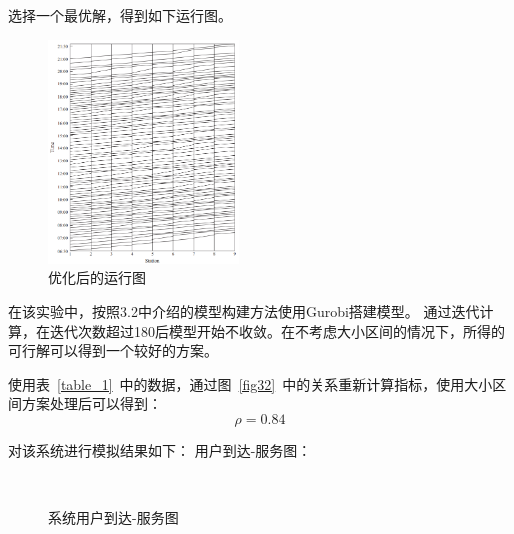选择一个最优解，得到如下运行图。
\begin{figure}[htbp!]
    \centering
    \includegraphics[width=0.45\textwidth]{figs/chap04/time.png}
    \caption{优化后的运行图}
    \label{fig45}
\end{figure}

在该实验中，按照3.2中介绍的模型构建方法使用Gurobi搭建模型。
通过迭代计算，在迭代次数超过180后模型开始不收敛。在不考虑大小区间的情况下，所得的可行解可以得到一个较好的方案。

使用表~\ref{table_1}~中的数据，通过图~\ref{fig32}~中的关系重新计算指标，使用大小区间方案处理后可以得到：
$$
\rho = 0.84
$$

对该系统进行模拟结果如下：
用户到达-服务图：
\begin{figure}[htbp]
    \center
    \\
    \caption{系统用户到达-服务图}\label{fig46}
\end{figure}


